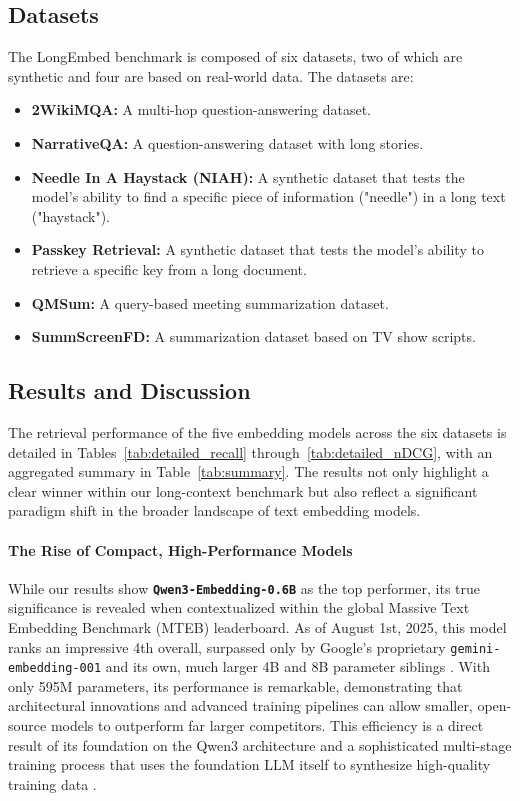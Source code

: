 \subsection{Datasets}
The LongEmbed benchmark is composed of six datasets, two of which are synthetic and four are based on real-world data. The datasets are:
\begin{itemize}
    \item \textbf{2WikiMQA:} A multi-hop question-answering dataset.
    \item \textbf{NarrativeQA:} A question-answering dataset with long stories.
    \item \textbf{Needle In A Haystack (NIAH):} A synthetic dataset that tests the model's ability to find a specific piece of information ("needle") in a long text ("haystack").
    \item \textbf{Passkey Retrieval:} A synthetic dataset that tests the model's ability to retrieve a specific key from a long document.
    \item \textbf{QMSum:} A query-based meeting summarization dataset.
    \item \textbf{SummScreenFD:} A summarization dataset based on TV show scripts.
\end{itemize}

\subsection{Results and Discussion}
The retrieval performance of the five embedding models across the six datasets is detailed in Tables~\ref{tab:detailed_recall} through~\ref{tab:detailed_nDCG}, with an aggregated summary in Table~\ref{tab:summary}. The results not only highlight a clear winner within our long-context benchmark but also reflect a significant paradigm shift in the broader landscape of text embedding models.

\paragraph{The Rise of Compact, High-Performance Models}
While our results show \textbf{\texttt{Qwen3-Embedding-0.6B}} as the top performer, its true significance is revealed when contextualized within the global Massive Text Embedding Benchmark (MTEB) leaderboard. As of August 1st, 2025, this model ranks an impressive 4th overall, surpassed only by Google's proprietary \texttt{gemini-embedding-001} and its own, much larger 4B and 8B parameter siblings \autocite{mteb_leaderboard_2025}. With only 595M parameters, its performance is remarkable, demonstrating that architectural innovations and advanced training pipelines can allow smaller, open-source models to outperform far larger competitors. This efficiency is a direct result of its foundation on the Qwen3 architecture \autocite{yang2025qwen3technicalreport} and a sophisticated multi-stage training process that uses the foundation LLM itself to synthesize high-quality training data \autocite{zhang2025qwen3embeddingadvancingtext}.

